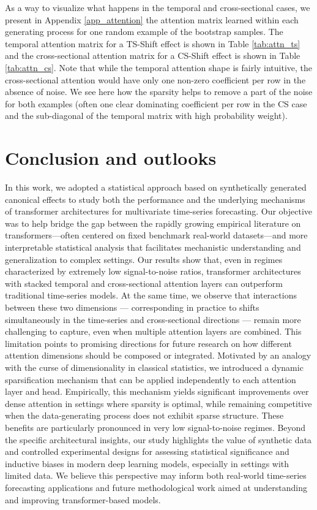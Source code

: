 \documentclass{article}
\begin{document}
As a way to visualize what happens in the temporal and cross-sectional cases, we present in Appendix \ref{app_attention} the attention matrix learned within each generating process for one random example of the bootstrap samples. The temporal attention matrix for a TS-Shift effect is shown in Table \ref{tab:attn_ts} and the cross-sectional attention matrix for a CS-Shift effect is shown in Table \ref{tab:attn_cs}. Note that while the temporal attention shape is fairly intuitive, the cross-sectional attention would have only one non-zero coefficient per row in the absence of noise. We see here how the sparsity helps to remove a part of the noise for both examples (often one clear dominating coefficient per row in the CS case and the sub-diagonal of the temporal matrix with high probability weight).



\section{Conclusion and outlooks}\label{sec_conclu}

In this work, we adopted a statistical approach based on synthetically generated canonical effects to study both the performance and the underlying mechanisms of transformer architectures for multivariate time-series forecasting. Our objective was to help bridge the gap between the rapidly growing empirical literature on transformers—often centered on fixed benchmark real-world datasets—and more interpretable statistical analysis that facilitates mechanistic understanding and generalization to complex settings.
Our results show that, even in regimes characterized by extremely low signal-to-noise ratios, transformer architectures with stacked temporal and cross-sectional attention layers can outperform traditional time-series models. At the same time, we observe that interactions between these two dimensions — corresponding in practice to shifts simultaneously in the time-series and cross-sectional directions — remain more challenging to capture, even when multiple attention layers are combined. This limitation points to promising directions for future research on how different attention dimensions should be composed or integrated.
Motivated by an analogy with the curse of dimensionality in classical statistics, we introduced a dynamic sparsification mechanism that can be applied independently to each attention layer and head. Empirically, this mechanism yields significant improvements over dense attention in settings where sparsity is optimal, while remaining competitive when the data-generating process does not exhibit sparse structure. These benefits are particularly pronounced in very low signal-to-noise regimes.
Beyond the specific architectural insights, our study highlights the value of synthetic data and controlled experimental designs for assessing statistical significance and inductive biases in modern deep learning models, especially in settings with limited data. We believe this perspective may inform both real-world time-series forecasting applications and future methodological work aimed at understanding and improving transformer-based models.
\end{document}
